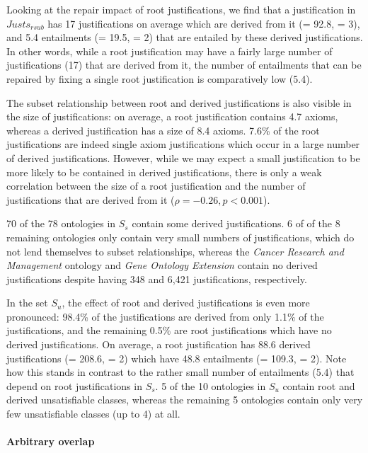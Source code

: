 Looking at the repair impact of root justifications, we find that a justification in $Justs_{rsub}$ has 17 justifications on average which are derived from it (\sdev = 92.8, \median = 3), and 5.4 entailments (\sdev = 19.5, \median = 2) that are entailed by these derived justifications. In other words, while a root justification may have a fairly large number of justifications (17) that are derived from it, the number of entailments that can be repaired by fixing a single root justification is comparatively low (5.4).

The subset relationship between root and derived justifications is also visible in the size of justifications: on average, a root justification contains 4.7 axioms, whereas a derived justification has a size of 8.4 axioms. 7.6\% of the root justifications are indeed single axiom justifications which occur in a large number of derived justifications. However, while we may expect a small justification to be more likely to be contained in derived justifications, there is only a weak correlation between the size of a root justification and the number of justifications that are derived from it ($\rho = -0.26, p < 0.001$).

70 of the 78 ontologies in $S_{s}$ contain some derived justifications. 6 of of the 8 remaining ontologies only contain very small numbers of justifications, which do not lend themselves to subset relationships, whereas the \emph{Cancer Research and Management} ontology and \emph{Gene Ontology Extension} contain no derived justifications despite having 348 and 6,421 justifications, respectively.

In the set $S_{u}$, the effect of root and derived justifications is even more pronounced: 98.4\% of the justifications are derived from only 1.1\% of the justifications, and the remaining 0.5\% are root justifications which have no derived justifications. On average, a root justification has 88.6 derived justifications (\sdev = 208.6, \median = 2) which have 48.8 entailments (\sdev = 109.3, \median = 2). Note how this stands in contrast to the rather small number of entailments (5.4) that depend on root justifications in $S_{s}$. 5 of the 10 ontologies in $S_{u}$ contain root and derived unsatisfiable classes, whereas the remaining 5 ontologies contain only very few unsatisfiable classes (up to 4) at all.


\paragraph{Arbitrary overlap}

